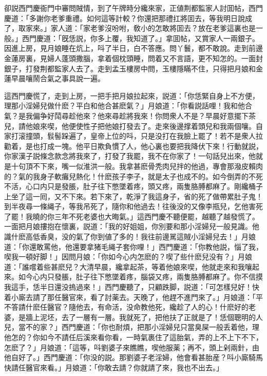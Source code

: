 卻説西門慶衙門中審問賊情，到了午牌時分纔來家，正値荆都監家人討囬帖，西門慶道：「多謝你老爹重禮。如何這等計較？你還把那禮扛將囬去，等我明日說成了，取家來。」家人道：「家老爹沒吩咐，敎小的怎敢將囬去？放在老爹這裏也是一般。」西門慶道：「旣恁説，你多上覆，我知道了。」拿囬帖，又賞家人一兩銀子。因進上房，見月娘睡在炕上，呌了半日，白不答應。問丫鬟，都不敢說。走到前邊金蓮房裏，見婦人蓬頭撒腦，拿着個枕頭睡，問着又不言語，更不知怎的。一面封銀子，打發荆都監家人去了。走到孟玉樓房中問，玉樓隱瞞不住，只得把月娘和金蓮早晨嚷鬧合氣之事具說一遍。

這西門慶慌了，走到上房，一把手把月娘拉起來，説道：「你恁緊自身上不方便，理那小淫婦兒做什麽？平白和他合甚麽氣？」月娘道：「你看説話哩！我和他合氣？是我偏争好鬦尋趁他來？他來尋趁將我來！你問衆人不是？早晨好意擺下茶兒，請他娘來喫，他便使性子把他娘打發去了。走來後邊撑着頭兒和我兩個嚷。自家打滚撞頭，䯼髻跺遍了，皇帝上位的呌，只是没打在我臉上罷了！若不是衆人拉勸着，是也打成一塊。他平日欺負慣了人，他心裏也要把我降伏下來！行動就説，你家漢子説條念款念將我來了，打發了我罷，我不在你家了！一句話兒出來，他就是十句頂不下來，嘴一似淮洪一般。我拿甚麽骨秃肉兒拌的他過，專會那潑皮賴肉的？氣的我身子軟癱兒熱化！什麽孩子李子，就是太子也成不的。如今倒弄的不死不活，心口内只是發脹，肚子往下憋墜着疼，頭又疼，兩隻胳膊都麻了。剛纔桶子上坐了這一囘，又不下來。若下來了，乾淨了我這身子，省的死了做帶累肚子鬼！到半夜尋一條䋲子，等我吊死了，隨你和他過去！往後没的又像李瓶兒，乞他害死了罷！我曉的你三年不死老婆也大晦氣。」這西門慶不聽便罷，越聽了越發慌了。一面把月娘摟抱在懷裏，説道：「我的好姐姐，你別要和那小淫婦兒一般見識。他識什麽高低香臭，没的氣了你到値了多的！我往前邊駡這賊小淫婦兒去！」月娘道：「你還敢罵他，他還要拿猪毛䋲子套你哩！」西門慶道：「你教他説，惱了我，喫我一頓好脚！」因問月娘：「你如今心内怎麽的？喫了些什麽兒没有？」月娘道：「誰嚐着些甚麽兒？大清早晨，纔拿起茶，等着他娘來喫，他就走來和我嚷起來。如今心内只發脹，肚子往下憋墜着疼，腦袋又疼，兩隻胳膊都麻了。你不信摸我這手，恁半日還没摀過來！」西門慶聽了，只顧跌脚，説道：「可怎樣兒好！快着小廝去請了那任醫官來，看了討薬去。天晚了，他趕不進門來了。」月娘道：「平不答請什麽任醫官？隨他去，有命活，没命教他死，纔趁了人的心！什麽好的老婆，是牆上泥坯，去了一層有一層。我就死了，把他扶了正就是了！恁個聰明的人兒，當不的家？」西門慶道：「你也耐煩，把那小淫婦兒只當臭屎一般丢着他，理他怎的？你如今不請任后溪來看你看，一時氣裹住了這胎氣，弄的上不上下不下，怎麽了？」月娘道：「這等，呌劉婆子來瞧瞧，喫他服薬；再不，頭上剁兩針，由他自好了。」西門慶道：「你没的説。那劉婆子老淫婦，他會看甚胎産？呌小廝騎馬快請任醫官來看。」月娘道：「你敢去請？你就請了來，我也不出去。」

